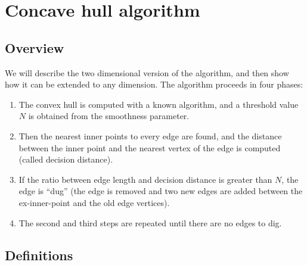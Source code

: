 \documentclass[a4paper]{article}
\begin{document}
\section{Concave hull algorithm}

\subsection{Overview}

We will describe the two dimensional version of the algorithm, and then show how it can be extended to any dimension. The algorithm proceeds in four phases:

\begin{enumerate}
    \item The convex hull is computed with a known algorithm, and a threshold value $N$ is obtained from the smoothness parameter.
    \item Then the nearest inner points to every edge are found, and the distance between the inner point and the nearest vertex of the edge is computed (called decision distance).
    \item If the ratio between edge length and decision distance is greater than $N$, the edge is ``dug'' (the edge is removed and two new edges are added between the ex-inner-point and the old edge vertices).
    \item The second and third steps are repeated until there are no edges to dig.
\end{enumerate}

\subsection{Definitions}
\end{document}
